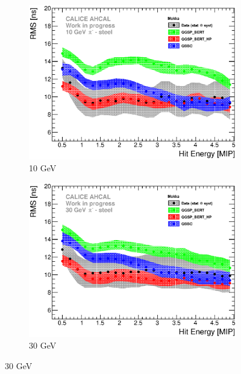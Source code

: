 
\begin{figure}[htbp!]
  \begin{subfigure}[t]{0.49\textwidth}
    \centering
    \includegraphics[width=1\textwidth]{../Thesis_Plots/Timing/Pions/Plots/ComparisonToSim/RMS_Energy_10GeV_Mokka.eps}
    \caption{10 GeV}\label{fig:Energy_RMS_SimData_10GeV}
  \end{subfigure}
  \hfill
  \begin{subfigure}[t]{0.49\textwidth}
    \centering
    \includegraphics[width=1\textwidth]{../Thesis_Plots/Timing/Pions/Plots/ComparisonToSim/RMS_Energy_30GeV_Mokka.eps}
    \caption{30 GeV}\label{fig:Energy_RMS_SimData_30GeV}
  \end{subfigure}

\end{figure}
